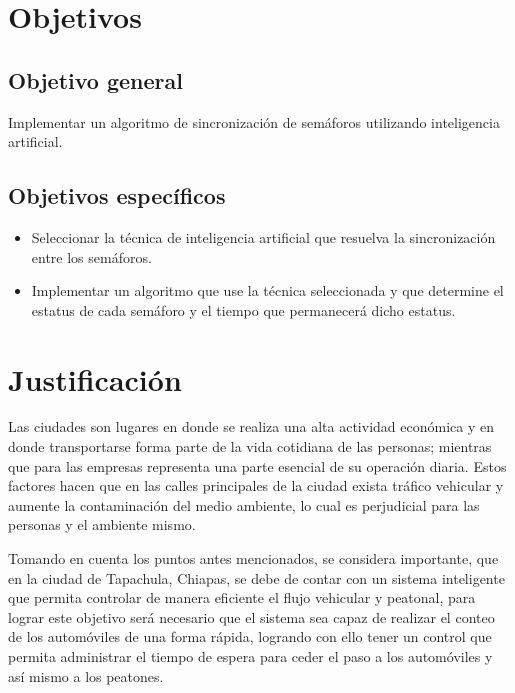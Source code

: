 \section{Objetivos}

\subsection*{Objetivo general}
Implementar un algoritmo de sincronización de semáforos utilizando inteligencia artificial.

\subsection*{Objetivos específicos}
\begin{itemize}
	\item Seleccionar la técnica de inteligencia artificial que resuelva la sincronización entre los semáforos.
	\item Implementar un algoritmo que use la técnica seleccionada y que determine el estatus de cada semáforo y el tiempo que permanecerá dicho estatus.
\end{itemize}

\section{Justificación}
Las ciudades son lugares en donde se realiza una alta actividad económica y en donde transportarse forma parte de la vida cotidiana de las personas; mientras que para las empresas representa una parte esencial de su operación diaria. Estos factores hacen que en las calles principales de la ciudad exista tráfico vehicular y aumente la contaminación del medio ambiente, lo cual es perjudicial para las personas y el ambiente mismo.

Tomando en cuenta los puntos antes mencionados, se considera importante, que en la ciudad de Tapachula, Chiapas, se debe de contar con un sistema inteligente que permita controlar de manera eficiente el flujo vehicular y peatonal, para lograr este objetivo será necesario que el sistema sea capaz de realizar el conteo de los automóviles de una forma rápida, logrando con ello tener un control que permita administrar el tiempo de espera para ceder el paso a los automóviles y así mismo a los peatones.
